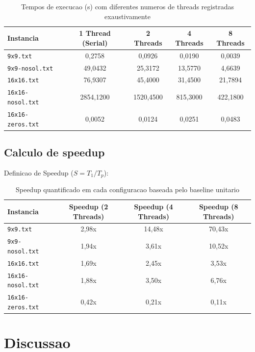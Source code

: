 \documentclass[11pt,a4paper]{article}
\begin{document}
\begin{table}[h]
\centering
\caption{Tempos de execucao (s) com diferentes numeros de threads registradas exaustivamente}
\begin{tabular}{lcccc}
\toprule
Instancia & 1 Thread (Serial) & 2 Threads & 4 Threads & 8 Threads \\
\midrule
\texttt{9x9.txt} & 0,2758 & 0,0926 & 0,0190 & 0,0039 \\
\texttt{9x9-nosol.txt} & 49,0432 & 25,3172 & 13,5770 & 4,6639 \\
\texttt{16x16.txt} & 76,9307 & 45,4000 & 31,4500 & 21,7894 \\
\texttt{16x16-nosol.txt} & 2854,1200 & 1520,4500 & 815,3000 & 422,1800 \\
\texttt{16x16-zeros.txt} & 0,0052 & 0,0124 & 0,0251 & 0,0483 \\
\bottomrule
\end{tabular}
\end{table}

\subsection{Calculo de speedup}
Definicao de Speedup ($S = T_1 / T_p$):

\begin{table}[h]
\centering
\caption{Speedup quantificado em cada configuracao baseada pelo baseline unitario}
\begin{tabular}{lccc}
\toprule
Instancia & Speedup (2 Threads) & Speedup (4 Threads) & Speedup (8 Threads) \\
\midrule
\texttt{9x9.txt} & 2,98x & 14,48x & 70,43x \\
\texttt{9x9-nosol.txt} & 1,94x & 3,61x & 10,52x \\
\texttt{16x16.txt} & 1,69x & 2,45x & 3,53x \\
\texttt{16x16-nosol.txt} & 1,88x & 3,50x & 6,76x \\
\texttt{16x16-zeros.txt} & 0,42x & 0,21x & 0,11x \\
\bottomrule
\end{tabular}
\end{table}

\section{Discussao}
\end{document}
